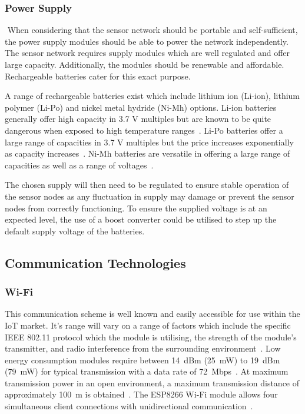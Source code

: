 \documentclass[10pt,twocolumn]{witseiepaper}
\begin{document}
		\subsubsection{Power Supply} $   $
			When considering that the sensor network should be portable and self-sufficient, the power supply modules should be able to power the network independently. The sensor network requires supply modules which are well regulated and offer large capacity. Additionally, the modules should be renewable and affordable. Rechargeable batteries cater for this exact purpose.

			A range of rechargeable batteries exist which include lithium ion (Li-ion), lithium polymer (Li-Po) and nickel metal hydride (Ni-Mh) options. Li-ion batteries generally offer high capacity in 3.7 V multiples but are known to be quite dangerous when exposed to high temperature ranges~\cite{li-ion}. Li-Po batteries offer a large range of capacities in 3.7 V multiples but the price increases exponentially as capacity increases~\cite{li-po}. Ni-Mh batteries are versatile in offering a large range of capacities as well as a range of voltages~\cite{ni-mh}.

			The chosen supply will then need to be regulated to ensure stable operation of the sensor nodes as any fluctuation in supply may damage or prevent the sensor nodes from correctly functioning. To ensure the supplied voltage is at an expected level, the use of a boost converter could be utilised to step up the default supply voltage of the batteries.
	
	\subsection{Communication Technologies}
		\subsubsection{Wi-Fi}
			This communication scheme is well known and easily accessible for use within the IoT market. It's range will vary on a range of factors which include the specific IEEE 802.11 protocol which the module is utilising, the strength of the module's transmitter, and radio interference from the surrounding environment~\cite{802.11}. Low energy consumption modules require between 14~dBm (25~mW) to 19~dBm (79~mW) for typical transmission with a data rate of 72~Mbps~\cite{esp12e}. At maximum transmission power in an open environment, a maximum transmission distance of approximately 100~m is obtained~\cite{esp12e}. The ESP8266 Wi-Fi module allows four simultaneous client connections with unidirectional communication~\cite{esp12e}.
\end{document}
